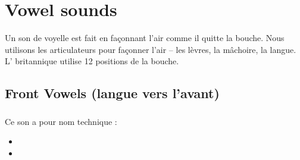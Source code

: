 \chapter{Vowel sounds}
\label{chap:vow}

Un son de voyelle est fait en façonnant l'air comme il quitte la
bouche. Nous utilisons les articulateurs pour façonner l'air -- les
lèvres, la mâchoire, la langue. L' britannique utilise 12 positions de la bouche.

\section{Front Vowels (langue vers l'avant)}
\label{sec:frontvow}



\subsection{}\label{sec:ilong}

Ce son a pour nom technique :

\begin{itemize}
\item {}
\item {}
\end{itemize}

\indicsound


